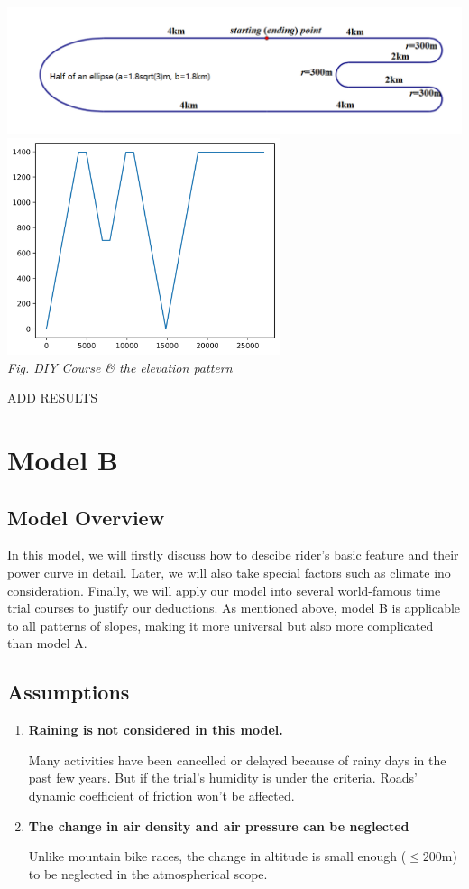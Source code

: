 \documentclass{article}
\begin{document}
			\begin{center}
				\includegraphics*[width=15cm]{8.png} \\
				\includegraphics[width=8cm]{diycourse.png}\\

				\small\textit{Fig. DIY Course \& the elevation pattern}
			\end{center}

			\Huge ADD RESULTS\normalsize
	\section{Model B}
		\subsection{Model Overview}
			In this model, we will firstly discuss how to descibe rider's basic feature and their power curve in detail. Later, we will also take special factors such as climate ino consideration. Finally, we will apply our model into several world-famous time trial courses to justify our deductions. As mentioned above, model B is applicable to all patterns of slopes, making it more universal but also more complicated than model A.
		\subsection{Assumptions}
			\begin{enumerate}
				\item	\textbf{Raining is not considered in this model.}

						Many activities have been cancelled or delayed because of rainy days in the past few years. But if the trial's humidity is under the criteria. Roads' dynamic coefficient of friction won't be affected.
				\item \textbf{The change in air density and air pressure can be neglected}

						Unlike mountain bike races, the change in altitude is small enough (\(\leq 200\mathrm{m}\)) to be neglected in the atmospherical scope.

			\end{enumerate}
\end{document}
